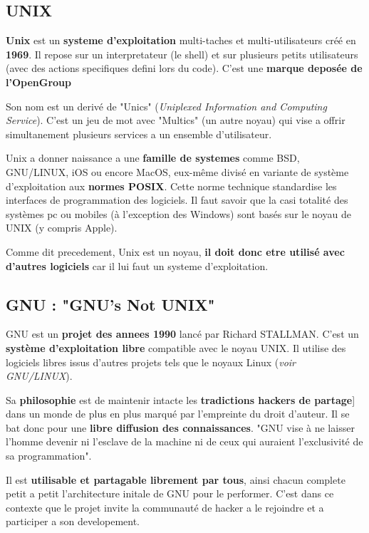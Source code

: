 \subsection{UNIX}

\textbf{Unix} est un \textbf{systeme d'exploitation} multi-taches et multi-utilisateurs créé en \textbf{1969}. Il repose sur un interpretateur (le shell) et sur plusieurs petits utilisateurs (avec des actions specifiques defini lors du code). C'est une \textbf{marque deposée de l'OpenGroup}

Son nom est un derivé de "Unics" (\textit{Uniplexed Information and Computing Service}). C'est un jeu de mot avec "Multics" (un autre noyau) qui vise a offrir simultanement plusieurs services a un ensemble d'utilisateur.

Unix a donner naissance a une \textbf{famille de systemes} comme BSD, GNU/LINUX, iOS ou encore MacOS, eux-même divisé en variante de système d'exploitation aux \textbf{normes POSIX}. Cette norme technique standardise les interfaces de programmation des logiciels. 
Il faut savoir que la casi totalité des systèmes pc ou mobiles (à l'exception des Windows) sont basés sur le noyau de UNIX (y compris Apple). 

Comme dit precedement, Unix est un noyau, \textbf{il doit donc etre utilisé avec d'autres logiciels} car il lui faut un systeme d'exploitation. \newline



\subsection{GNU : "GNU's Not UNIX"}

GNU est un \textbf{projet des annees 1990} lancé par Richard STALLMAN. C'est un \textbf{système d'exploitation libre} compatible avec le noyau UNIX. Il utilise des logiciels libres issus d'autres projets tels que le noyaux Linux (\textit{voir GNU/LINUX}). 

Sa \textbf{philosophie} est de maintenir intacte les \textbf{tradictions hackers de partage}] dans un monde de plus en plus marqué par l'empreinte du droit d'auteur. Il se bat donc pour une \textbf{libre diffusion des connaissances}. "GNU vise à ne laisser l'homme devenir ni l'esclave de la machine ni de ceux qui auraient l'exclusivité de sa programmation". 

Il est \textbf{utilisable et partagable librement par tous}, ainsi chacun complete petit a petit l'architecture initale de GNU pour le performer. C'est dans ce contexte que le projet invite la communauté de hacker a le rejoindre et a participer a son developement. 

